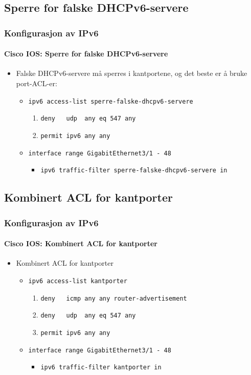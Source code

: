 \subsection{Sperre for falske DHCPv6-servere}
\begin{frame}%
  \frametitle{Konfigurasjon av IPv6}
  \framesubtitle{Cisco IOS: Sperre for falske DHCPv6-servere}
  \pause
  \begin{itemize}[<+->]
  \item Falske DHCPv6-servere må sperres i kantportene, og det beste
    er å bruke port-ACL-er:
    \begin{itemize}[<+->]
    \item \texttt{ipv6 access-list sperre-falske-dhcpv6-servere}
      \begin{enumerate}[<+->]
      \item \texttt{deny\ \ \ udp\ \ any eq 547           any}
      \item \texttt{permit    ipv6   any \phantom{eq 547} any}
      \end{enumerate}
    \item \texttt{interface range GigabitEthernet3/1 - 48}
      \begin{itemize}[<+->]
      \item \texttt{ipv6 traffic-filter sperre-falske-dhcpv6-servere in}
      \end{itemize}
    \end{itemize}
  \end{itemize}
\end{frame}

\subsection{Kombinert ACL for kantporter}
\begin{frame}%
  \frametitle{Konfigurasjon av IPv6}
  \framesubtitle{Cisco IOS: Kombinert ACL for kantporter}
  \pause
  \begin{itemize}[<+->]
  \item Kombinert ACL for kantporter
    \begin{itemize}[<+->]
    \item \texttt{ipv6 access-list kantporter}
      \begin{enumerate}[<+->]
      \item \texttt{deny\ \ \ icmp   any \phantom{eq 547} any router-advertisement}
      \item \texttt{deny\ \ \ udp\ \ any eq 547           any}
      \item \texttt{permit    ipv6   any \phantom{eq 547} any}
      \end{enumerate}
    \item \texttt{interface range GigabitEthernet3/1 - 48}
      \begin{itemize}[<+->]
      \item \texttt{ipv6 traffic-filter kantporter in}
      \end{itemize}
    \end{itemize}
  \end{itemize}
\end{frame}

